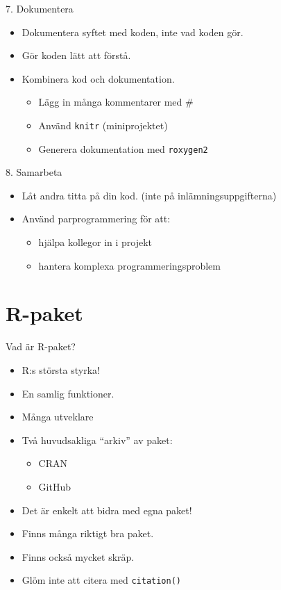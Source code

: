 \documentclass[
  11pt,
  ignorenonframetext,
]{beamer}
\providecommand{\tightlist}{%
  \setlength{\itemsep}{0pt}\setlength{\parskip}{0pt}}
\begin{document}
\begin{frame}{7. Dokumentera}
\label{dokumentera}
\begin{itemize}
\tightlist
\item
  Dokumentera syftet med koden, inte vad koden gör.
\item
  Gör koden lätt att förstå.
\item
  Kombinera kod och dokumentation.

  \begin{itemize}
  \tightlist
  \item
    Lägg in många kommentarer med \#
  \item
    Använd \texttt{knitr} (miniprojektet)
  \item
    Generera dokumentation med \texttt{roxygen2}
  \end{itemize}
\end{itemize}
\end{frame}

\begin{frame}{8. Samarbeta}
\label{samarbeta}
\begin{itemize}
\tightlist
\item
  Låt andra titta på din kod. (inte på inlämningsuppgifterna)
\item
  Använd parprogrammering för att:

  \begin{itemize}
  \tightlist
  \item
    hjälpa kollegor in i projekt
  \item
    hantera komplexa programmeringsproblem
  \end{itemize}
\end{itemize}
\end{frame}

\section{R-paket}\label{r-paket}

\begin{frame}{Vad är R-paket?}
\label{vad-uxe4r-r-paket}
\begin{itemize}
\tightlist
\item
  R:s största styrka!
\item
  En samlig funktioner.
\item
  Många utveklare
\item
  Två huvudsakliga ``arkiv'' av paket:

  \begin{itemize}
  \tightlist
  \item
    CRAN
  \item
    GitHub
  \end{itemize}
\item
  Det är enkelt att bidra med egna paket!
\item
  Finns många riktigt bra paket.
\item
  Finns också mycket skräp.
\item
  Glöm inte att citera med \texttt{citation()}
\end{itemize}
\end{frame}
\end{document}
